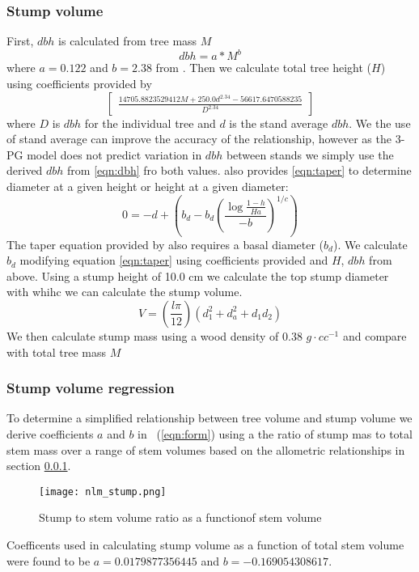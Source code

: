 \subsubsection{Stump volume}
\label{sec:allo}
First, $dbh$ is calculated from tree mass $M$
\begin{equation}
    \label{eqn:dbh}
    dbh=a*M^b
    \end{equation}where $a=0.122$ and $b=2.38$ from \cite{Landsberg1997}.
Then we calculate total tree height ($H$) using coefficients provided by \cite{Brahim2000}
\begin{equation}
    \label{eqn:height}
    \begin{bmatrix}\frac{14705.8823529412 M + 250.0 d^{2.34} -56617.6470588235}{D^{2.34}}\end{bmatrix}
    \end{equation}where $D$ is $dbh$ for the individual tree and $d$ is the stand average $dbh$. We the use of stand average can improve the accuracy of the relationship, however as the 3-PG model does not predict variation in $dbh$ between stands we simply use the derived $dbh$ from \ref{eqn:dbh} fro both values. \citeauthor{Benbrahim2003} also provides \ref{eqn:taper} to determine diameter at a given height or height at a given diameter:
\begin{equation}
    \label{eqn:taper}
    0=-d+\left(b_d-b_d\left(\frac{\log{\frac{1-h}{Ha}}}{-b}\right)^{1/c}\right)
    \end{equation}The taper equation provided by \citeauthor{Benbrahim2003} also requires a basal diameter ($b_d$). We calculate $b_d$ modifying equation \ref{eqn:taper} using coefficients provided and $H$, $dbh$ from above. Using a stump height of 10.0 cm we calculate the top stump diameter with whihc we can calculate the stump volume.
\begin{equation}
    \label{eqn:sectionvolume}
    V=\left(\frac{l\pi}{12}\right)(d_1^2+d_a^2+d_1d_2)
    \end{equation}We then calculate stump mass using a wood density of 0.38 $g \cdot cc^{-1}$ and compare with total tree mass $M$
\subsubsection{Stump volume regression}
To determine a simplified relationship between tree volume and stump volume we derive coefficients $a$ and $b$ in ~(\ref{eqn:form}) using a the ratio of stump mas to total stem mass over a range of stem volumes based on the allometric relationships in section \ref{sec:allo}.\begin{figure}[h]
     \centering
    \texttt{[image: nlm\_stump.png]}
    \caption{Stump to stem volume ratio as a functionof stem volume}
    \label{fig:stump_vol}
    \end{figure}
Coefficents used in calculating stump volume as a function of total stem volume were found to be $a=0.0179877356445$ and $b=-0.169054308617$.